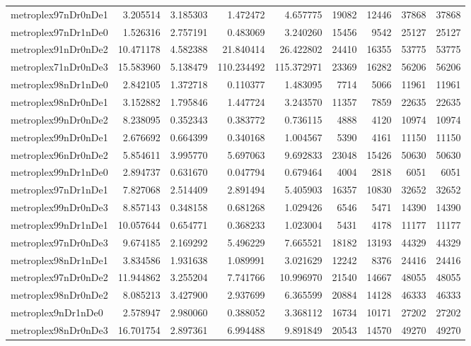 \begin{longtable}{|l|r|r|r|r|r|r|r|r|}
metroplex97nDr0nDe1 & 3.205514 & 3.185303 & 1.472472 & 4.657775 & 19082 & 12446 & 37868 & 37868 \\
metroplex97nDr1nDe0 & 1.526316 & 2.757191 & 0.483069 & 3.240260 & 15456 & 9542 & 25127 & 25127 \\
metroplex91nDr0nDe2 & 10.471178 & 4.582388 & 21.840414 & 26.422802 & 24410 & 16355 & 53775 & 53775 \\
metroplex71nDr0nDe3 & 15.583960 & 5.138479 & 110.234492 & 115.372971 & 23369 & 16282 & 56206 & 56206 \\
metroplex98nDr1nDe0 & 2.842105 & 1.372718 & 0.110377 & 1.483095 & 7714 & 5066 & 11961 & 11961 \\
metroplex98nDr0nDe1 & 3.152882 & 1.795846 & 1.447724 & 3.243570 & 11357 & 7859 & 22635 & 22635 \\
metroplex99nDr0nDe2 & 8.238095 & 0.352343 & 0.383772 & 0.736115 & 4888 & 4120 & 10974 & 10974 \\
metroplex99nDr0nDe1 & 2.676692 & 0.664399 & 0.340168 & 1.004567 & 5390 & 4161 & 11150 & 11150 \\
metroplex96nDr0nDe2 & 5.854611 & 3.995770 & 5.697063 & 9.692833 & 23048 & 15426 & 50630 & 50630 \\
metroplex99nDr1nDe0 & 2.894737 & 0.631670 & 0.047794 & 0.679464 & 4004 & 2818 & 6051 & 6051 \\
metroplex97nDr1nDe1 & 7.827068 & 2.514409 & 2.891494 & 5.405903 & 16357 & 10830 & 32652 & 32652 \\
metroplex99nDr0nDe3 & 8.857143 & 0.348158 & 0.681268 & 1.029426 & 6546 & 5471 & 14390 & 14390 \\
metroplex99nDr1nDe1 & 10.057644 & 0.654771 & 0.368233 & 1.023004 & 5431 & 4178 & 11177 & 11177 \\
metroplex97nDr0nDe3 & 9.674185 & 2.169292 & 5.496229 & 7.665521 & 18182 & 13193 & 44329 & 44329 \\
metroplex98nDr1nDe1 & 3.834586 & 1.931638 & 1.089991 & 3.021629 & 12242 & 8376 & 24416 & 24416 \\
metroplex97nDr0nDe2 & 11.944862 & 3.255204 & 7.741766 & 10.996970 & 21540 & 14667 & 48055 & 48055 \\
metroplex98nDr0nDe2 & 8.085213 & 3.427900 & 2.937699 & 6.365599 & 20884 & 14128 & 46333 & 46333 \\
metroplex9nDr1nDe0 & 2.578947 & 2.980060 & 0.388052 & 3.368112 & 16734 & 10171 & 27202 & 27202 \\
metroplex98nDr0nDe3 & 16.701754 & 2.897361 & 6.994488 & 9.891849 & 20543 & 14570 & 49270 & 49270 \\

\end{longtable}
